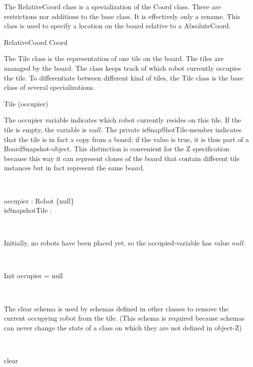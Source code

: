 \documentclass[12pt]{article}
\begin{document}
The RelativeCoord class is a specialization of the Coord class. There are restrictions nor additions to the base class. It is effectively only a rename. This class is used to specify a location on the board relative to a AbsoluteCoord.
\begin{class}{RelativeCoord}
Coord \\
\end{class}

The Tile class is the representation of one tile on the board. The tiles are managed by the board. The class keeps track of which robot currently occupies the tile. To differentiate between different kind of tiles, the Tile class is the base class of several specializations.

\begin{class}{Tile}
\upharpoonright (occupier) \\
\begin{zpar}
The occupier variable indicates which robot currently resides on this tile. If the tile is empty, the variable is $null$. The private isSnapShotTile-member indicates that the tile is in fact a copy from a board; if the value is true, it is thus part of a BoardSnapshot-object. This distinction is convenient for the Z specification because this way it can represent clones of the board that contain different tile instances but in fact represent the same board.
\end{zpar} \\
\begin{state}
occupier : Robot \cup \{null\} \\
isSnapshotTile : \bool \\
\end{state} \\
\begin{zpar}
Initially, no robots have been placed yet, so the occupied-variable has value $null$.
\end{zpar} \\
\begin{schema}{Init}
occupier = null
\end{schema} \\
\begin{zpar}
The clear schema is used by schemas defined in other classes to remove the current occupying robot from the tile. (This schema is required because schemas can never change the state of a class on which they are not defined in object-Z)
\end{zpar} \\
\begin{schema}{clear}

\end{schema}
\end{class}
\end{document}
